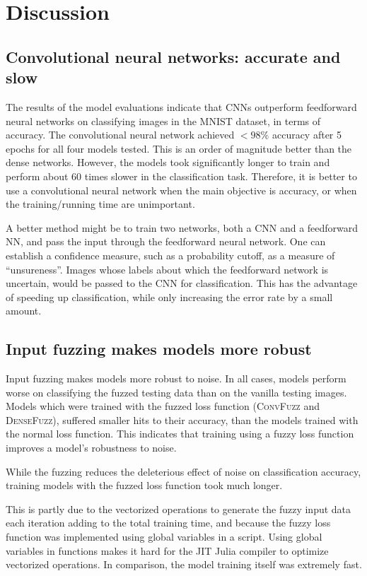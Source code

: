 \documentclass{article}
\begin{document}
\section{Discussion}

\subsection{Convolutional neural networks: accurate and slow}

The results of the model evaluations indicate that CNNs outperform feedforward neural networks
on classifying images in the MNIST dataset, in terms of accuracy.
The convolutional neural network achieved $< 98\%$ accuracy after 5 epochs
for all four models tested.
This is an order of magnitude better than the dense networks.
However, the models took significantly longer to train and perform about 60 times slower
in the classification task.
Therefore, it is better to use a convolutional neural network
when the main objective is accuracy, or when the training/running time are unimportant.

A better method might be to train two networks, both a CNN and a feedforward NN,
and pass the input through the feedforward neural network.
One can establish a confidence measure, such as a probability cutoff,
as a measure of ``unsureness''.
Images whose labels about which the feedforward network is uncertain,
would be passed to the CNN for classification.
This has the advantage of speeding up classification,
while only increasing the error rate by a small amount.

\subsection{Input fuzzing makes models more robust}

Input fuzzing makes models more robust to noise.
In all cases, models perform worse on classifying the fuzzed testing data
than on the vanilla testing images.
Models which were trained with the fuzzed loss function (\textsc{ConvFuzz} and \textsc{DenseFuzz}),
suffered smaller hits to their accuracy, than the models trained with the normal loss function.
This indicates that training using a fuzzy loss function improves a model's robustness to noise.

While the fuzzing reduces the deleterious effect of noise on classification accuracy,
training models with the fuzzed loss function took much longer.

This is partly due to the vectorized operations to generate the fuzzy input data each iteration
adding to the total training time,
and because the fuzzy loss function was implemented using global variables in a script.
Using global variables in functions makes it hard for the JIT Julia compiler to optimize vectorized operations.
In comparison, the model training itself was extremely fast.
\end{document}
